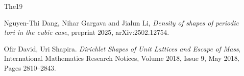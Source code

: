 \documentclass{amsart}
\numberwithin{equation}{section}
\begin{document}
\begin{thebibliography}{{The}19}












 Nguyen-Thi Dang, Nihar Gargava and Jialun Li, {\em Density of shapes of periodic tori in the cubic case}, preprint 2025, arXiv:2502.12754.

Ofir David, Uri Shapira. \emph{Dirichlet Shapes of Unit Lattices and Escape of Mass}, International Mathematics Research Notices, Volume 2018, Issue 9, May 2018, Pages 2810–2843.











\end{thebibliography}
\end{document}
